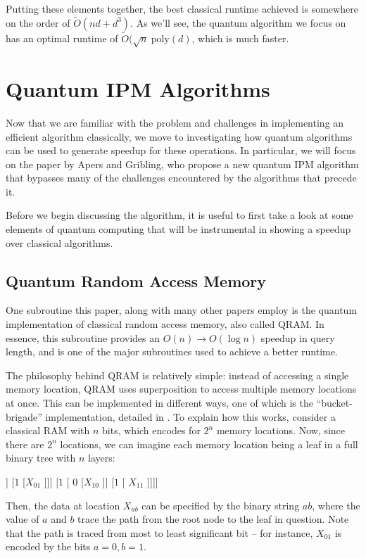 \documentclass[11pt]{article}
\begin{document}
Putting these elements together, the best classical runtime achieved is somewhere on the order of \( \widetilde
O(nd + d^{3})\). As we'll see, the quantum algorithm we focus on has an optimal runtime of \( \widetilde O(
\sqrt{n} \ \mathrm{poly}(d)\), which is much faster. 

	\section{Quantum IPM Algorithms} 
	Now that we are familiar with the problem and challenges in implementing an efficient algorithm classically, 
	we move to investigating how quantum algorithms can be used to generate speedup for these operations. In 
	particular, we will focus on the paper by Apers and Gribling, who propose a new quantum IPM algorithm that 
	bypasses many of the challenges encountered by the algorithms that precede it. 

	Before we begin discussing the algorithm, it is useful to first take a look at some elements of quantum computing 
	that will be instrumental in showing a speedup over classical algorithms. 

	\subsection{Quantum Random Access Memory}
	One subroutine this paper, along with many other papers employ is the quantum implementation of classical 
	random access memory, also called QRAM. In essence, this subroutine provides an \( O(n) \to O(\log n) \) speedup in 
	query length, and is one of the major subroutines used to achieve a better runtime. 

	The philosophy behind QRAM is relatively simple: instead of accessing a single memory location, 
	QRAM uses superposition to access multiple memory locations at once. This can be implemented in different ways, 
	one of which is the ``bucket-brigade'' implementation, detailed in \cite{giovannettiQuantumRandomAccess2008}. 
	To explain how this works, consider a classical 
	RAM with \( n \) bits, which encodes for \( 2^{n} \) memory locations. Now, since there are \( 2^{n} \) locations, 
	we can imagine each memory location being a leaf in a full binary tree with \( n \) layers:  

	\begin{center}
		\begin{forest}
			[\( \cdot \) [\( 0 \) [\( 0 \) [ \( X_{00} \)]] [\( 1 \) [\( X_{01} \) ]]] [\( 1 \) 
			[ \( 0 \) [\( X_{10} \) ]] [\( 1 \) [ \( X_{11} \) ]]]]
		\end{forest}
	\end{center}
	Then, the data at location \( X_{ab} \) can be specified by the binary string \( ab \), where the value of 
	\( a \) and \( b \) trace the path from the root node to the leaf in question. Note that the path 
	is traced from most to least significant bit -- for instance, \( X_{01} \) 
	is encoded by the bits \( a = 0, b = 1 \). 
\end{document}
